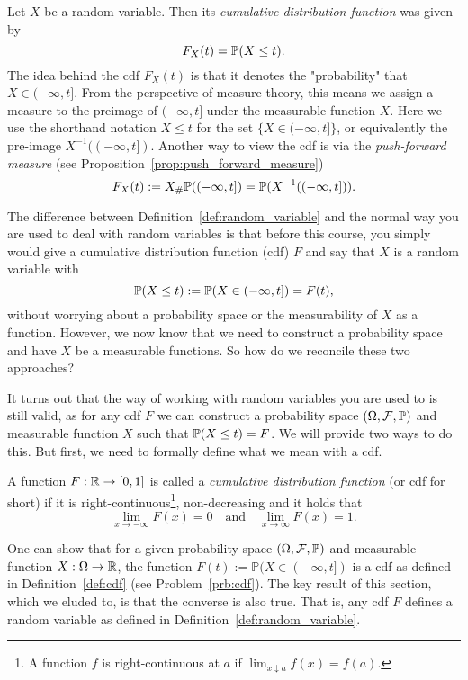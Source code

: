 Let $X$ be a random variable. Then its \emph{cumulative distribution function} was given by 
\[
	F_X(t) = \mathbb P(X \le t).
\] 
The idea behind the cdf $F_X(t)$ is that it denotes the "probability" that $X \in (-\infty ,t]$. From the perspective of measure theory, this means we assign a measure to the preimage of $(-\infty, t]$ under the measurable function $X$. Here we use the shorthand notation $X \le t$ for the set $\{X \in (-\infty, t]\}$, or equivalently the pre-image $X^{-1}((-\infty,t])$. Another way to view the cdf is via the \emph{push-forward measure} (see Proposition~\ref{prop:push_forward_measure})
\[
	F_X(t) := X_\# \mathbb P((-\infty, t]) = \mathbb P(X^{-1}((-\infty,t])).
\]

The difference between Definition~\ref{def:random_variable} and the normal way you are used to deal with random variables is that before this course, you simply would give a cumulative distribution function (cdf) $F$ and say that $X$ is a random variable with 
\[
	\mathbb P(X \le t) := \mathbb P(X \in (-\infty,t])= F(t),
\] 
without worrying about a probability space or the measurability of $X$ as a function. However, we now know that we need to construct a probability space and have $X$ be a measurable functions. So how do we reconcile these two approaches? 

It turns out that the way of working with random variables you are used to is still valid, as for any cdf $F$ we can construct a probability space $(\Omega, \mathcal F, \mathbb P)$ and measurable function $X$ such that $\mathbb P(X \le t) = F$. We will provide two ways to do this. But first, we need to formally define what we mean with a cdf.

\begin{definition}\label{def:cdf}
A function $F : \mathbb R \to [0,1]$ is called a \emph{cumulative distribution function} (or cdf for short) if it is right-continuous\footnote{A function $f$ is right-continuous at $a$ if $\lim_{x \downarrow a} f(x) = f(a)$.}, non-decreasing and it holds that 
\[
	\lim_{x \to -\infty} F(x) = 0 \quad \text{and} \quad \lim_{x \to \infty} F(x) = 1.
\]
\end{definition}

One can show that for a given probability space $(\Omega, \mathcal F, \mathbb P)$ and measurable function $X : \Omega \to \mathbb R$, the function $F(t) := \mathbb{P}(X \in (-\infty,t])$ is a cdf as defined in Definition~\ref{def:cdf} (see Problem~\ref{prb:cdf}). The key result of this section, which we eluded to, is that the converse is also true. That is, any cdf $F$ defines a random variable as defined in Definition~\ref{def:random_variable}.

